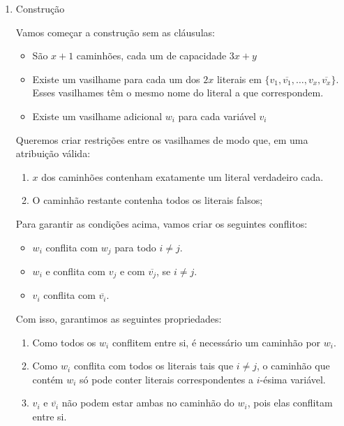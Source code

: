\documentclass[11pt]{article}
\begin{document}
\begin{enumerate}
\item Construção
\label{sec-5-3-2-1}

Vamos começar a construção sem as cláusulas:

\begin{itemize}
\item São $x+1$ caminhões, cada um de capacidade $3x+y$

\item Existe um vasilhame para cada um dos $2x$ literais em $\{v_1,
  \overline{v_1}, \ldots, v_x, \overline{v_x}\}$. Esses vasilhames têm o
mesmo nome do literal a que correspondem.

\item Existe um vasilhame adicional $w_i$ para cada variável $v_i$
\end{itemize}

Queremos criar restrições entre os vasilhames de modo que, em uma
atribuição válida:

\begin{enumerate}
\item $x$ dos caminhões contenham exatamente um literal verdadeiro cada.
\item O caminhão restante contenha todos os literais falsos;
\end{enumerate}

Para garantir as condições acima, vamos criar os seguintes conflitos:
\begin{itemize}
\item $w_i$ conflita com $w_j$ para todo $i \neq j$.
\item $w_i$ e conflita com $v_j$ e com $\overline{v_j}$, se $i \neq j$.
\item $v_i$ conflita com $\overline{v_i}$.
\end{itemize}

Com isso, garantimos as seguintes propriedades:

\begin{enumerate}[($P_1$)]
\item Como todos os $w_i$ conflitem entre si, é necessário um
caminhão por $w_i$.

\item Como $w_i$ conflita com todos os literais tais que
$i \neq j$, o caminhão que contém $w_i$ só pode conter literais
correspondentes a $i$-ésima variável.

\item $v_i$ e $\overline{v_i}$ não
podem estar ambas no caminhão do $w_i$, pois elas conflitam entre si.
\end{enumerate}


\end{enumerate}
\end{document}

